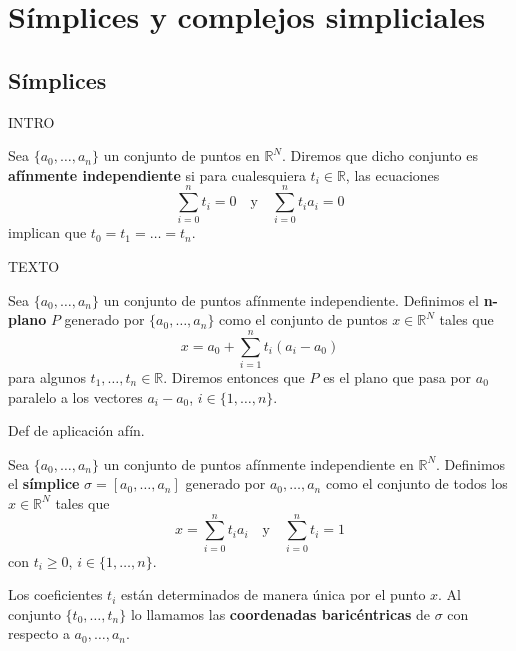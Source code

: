 
\chapter{Símplices y complejos simpliciales}

\section{Símplices}

INTRO

\begin{definicion}
	Sea $\{a_0, \dots, a_n\}$ un conjunto de puntos en $\mathbb{R}^N$. 
	Diremos que dicho conjunto es \textbf{afínmente independiente} si 
	para cualesquiera $t_i \in \mathbb{R}$, las ecuaciones
	\[ \sum_{i=0}^{n}t_i=0 \quad \text{y} \quad \sum_{i=0}^{n}t_ia_i=0 \]
	implican que $t_0 = t_1 = \dots = t_n$.
\end{definicion}

TEXTO

\begin{definicion}
	Sea $\{a_0, \dots, a_n\}$ un conjunto de puntos afínmente independiente. 
	Definimos el \textbf{n-plano} $P$ generado por $\{a_0, \dots, a_n\}$ como
	el conjunto de puntos $x \in \mathbb{R}^N$ tales que
	\[ x = a_0 + \sum_{i=1}^{n}t_i(a_i - a_0) \]
	para algunos $t_1, \dots, t_n \in \mathbb{R}$. Diremos entonces que $P$ es el 
	plano que pasa por $a_0$ paralelo a los vectores $a_i - a_0$, $i \in \{1, \dots, n\}$.
\end{definicion}

\begin{definicion}
	Def de aplicación afín.
\end{definicion}

\begin{definicion}
	Sea $\{a_0, \dots, a_n\}$ un conjunto de puntos afínmente independiente en 
	$\mathbb{R}^N$. Definimos el \textbf{símplice} $\sigma = [a_0, \dots, a_n]$ 
	generado por $a_0, 	\dots, a_n$ como el conjunto de todos los $x \in \mathbb{R}^N$ 
	tales que
	\[ x=\sum_{i=0}^{n}t_ia_i \quad \text{y} \quad \sum_{i=0}^{n}t_i=1 \]
	con $t_i \geq 0$, $i \in \{1, \dots, n\}$.
\end{definicion}
Los coeficientes $t_i$ están determinados de manera única por el punto $x$. Al conjunto 
$\{t_0, \dots, t_n \}$ lo llamamos las \textbf{coordenadas baricéntricas} de $\sigma$
con respecto a $a_0, \dots, a_n$.

